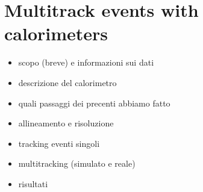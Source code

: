 
\chapter{Multitrack events with calorimeters}
\label{cap:multitraccia}

\begin{itemize}
\item scopo (breve) e informazioni sui dati
\item descrizione del calorimetro
\item quali passaggi dei precenti abbiamo fatto
\item allineamento e risoluzione
\item tracking eventi singoli
\item multitracking (simulato e reale)
\item risultati
\end{itemize}


